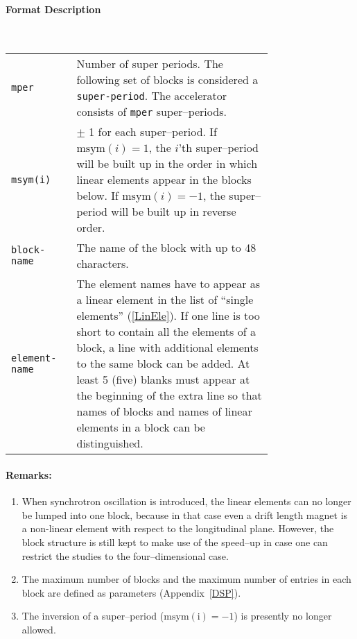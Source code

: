 \paragraph{Format Description}~

\bigskip
\begin{tabular}{@{}lp{0.75\linewidth}}
    \texttt{mper} & Number of super periods. The following set of blocks is considered a \texttt{super-period}. The accelerator consists of \texttt{mper} super--periods. \\
    \texttt{msym(i)} & $\pm$ 1 for each super--period. If $\mathrm{msym}(i)=1$, the \mbox{$i$'th} super--period will be built up in the order in which linear elements appear in the blocks  below. If $\mathrm{msym}(i)=-1$, the super--period will be built up in reverse order. \\
    \texttt{block-name} & The name of the block with up to 48 characters. \\
    \texttt{element-name} & The element names have to appear as a linear element in the list of ``single elements'' (\ref{LinEle}). If one line is too short to contain all the elements of a block, a line with additional elements to the same block can be added. At least 5 (five) blanks must appear at the beginning of the extra line so that names of blocks and names of linear elements in a block can be distinguished.
\end{tabular}

\paragraph{Remarks:}
\begin{enumerate}
    \item When synchrotron oscillation is introduced, the linear elements can no longer be lumped into one block, because in that case even a drift length magnet is a non-linear element with respect to the longitudinal plane. However, the block structure is still kept to make use of the speed--up in case one can restrict the studies to the four--dimensional case.
    \item The maximum number of blocks and the maximum number of entries in each block are defined as parameters (Appendix~\ref{DSP}).
    \item The inversion of a super--period ($\mathrm{msym(i)} = -1$) is presently no longer allowed.
\end{enumerate}

